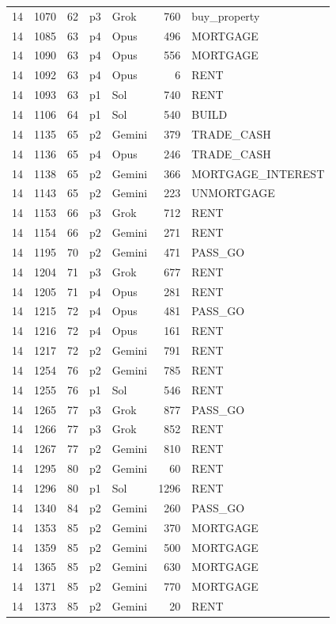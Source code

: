 \begin{longtable}{r r r l l r L{2.2in}}
14 & 1070 & 62 & p3 & Grok & 760 & buy\_property \\
14 & 1085 & 63 & p4 & Opus & 496 & MORTGAGE \\
14 & 1090 & 63 & p4 & Opus & 556 & MORTGAGE \\
14 & 1092 & 63 & p4 & Opus & 6 & RENT \\
14 & 1093 & 63 & p1 & Sol & 740 & RENT \\
14 & 1106 & 64 & p1 & Sol & 540 & BUILD \\
14 & 1135 & 65 & p2 & Gemini & 379 & TRADE\_CASH \\
14 & 1136 & 65 & p4 & Opus & 246 & TRADE\_CASH \\
14 & 1138 & 65 & p2 & Gemini & 366 & MORTGAGE\_INTEREST \\
14 & 1143 & 65 & p2 & Gemini & 223 & UNMORTGAGE \\
14 & 1153 & 66 & p3 & Grok & 712 & RENT \\
14 & 1154 & 66 & p2 & Gemini & 271 & RENT \\
14 & 1195 & 70 & p2 & Gemini & 471 & PASS\_GO \\
14 & 1204 & 71 & p3 & Grok & 677 & RENT \\
14 & 1205 & 71 & p4 & Opus & 281 & RENT \\
14 & 1215 & 72 & p4 & Opus & 481 & PASS\_GO \\
14 & 1216 & 72 & p4 & Opus & 161 & RENT \\
14 & 1217 & 72 & p2 & Gemini & 791 & RENT \\
14 & 1254 & 76 & p2 & Gemini & 785 & RENT \\
14 & 1255 & 76 & p1 & Sol & 546 & RENT \\
14 & 1265 & 77 & p3 & Grok & 877 & PASS\_GO \\
14 & 1266 & 77 & p3 & Grok & 852 & RENT \\
14 & 1267 & 77 & p2 & Gemini & 810 & RENT \\
14 & 1295 & 80 & p2 & Gemini & 60 & RENT \\
14 & 1296 & 80 & p1 & Sol & 1296 & RENT \\
14 & 1340 & 84 & p2 & Gemini & 260 & PASS\_GO \\
14 & 1353 & 85 & p2 & Gemini & 370 & MORTGAGE \\
14 & 1359 & 85 & p2 & Gemini & 500 & MORTGAGE \\
14 & 1365 & 85 & p2 & Gemini & 630 & MORTGAGE \\
14 & 1371 & 85 & p2 & Gemini & 770 & MORTGAGE \\
14 & 1373 & 85 & p2 & Gemini & 20 & RENT \\

\end{longtable}
